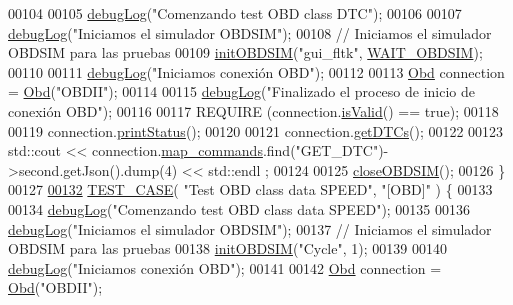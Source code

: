 \begin{DoxyCode}
{{{00104     
00105     \hyperlink{debug_8hpp_a55f41cf7b0585224496de3d7adbc101c}{debugLog}(\textcolor{stringliteral}{"Comenzando test OBD class DTC"});
00106 
00107     \hyperlink{debug_8hpp_a55f41cf7b0585224496de3d7adbc101c}{debugLog}(\textcolor{stringliteral}{"Iniciamos el simulador OBDSIM"});
00108     \textcolor{comment}{// Iniciamos el simulador OBDSIM para las pruebas}
00109     \hyperlink{UnitTestCase_8cpp_a15137ff9ba6032f171a43694f159ada6}{initOBDSIM}(\textcolor{stringliteral}{"gui\_fltk"}, \hyperlink{UnitTestCase_8cpp_a39116fcd47bddafea0487b3f674b9609}{WAIT\_OBDSIM});
00110 
00111     \hyperlink{debug_8hpp_a55f41cf7b0585224496de3d7adbc101c}{debugLog}(\textcolor{stringliteral}{"Iniciamos conexión OBD"});
00112 
00113     \hyperlink{classObd}{Obd} connection = \hyperlink{classObd}{Obd}(\textcolor{stringliteral}{"OBDII"});
00114 
00115     \hyperlink{debug_8hpp_a55f41cf7b0585224496de3d7adbc101c}{debugLog}(\textcolor{stringliteral}{"Finalizado el proceso de inicio de conexión OBD"});
00116 
00117     REQUIRE (connection.\hyperlink{classObd_ae28b765bb787467f929eae932133d2aa}{isValid}() == \textcolor{keyword}{true});
00118 
00119     connection.\hyperlink{classObd_a0938bfdd6d05795e826a239cc0f29f32}{printStatus}();
00120 
00121     connection.\hyperlink{classObd_ac57afb9228d933c6be5b2fa8e6446036}{getDTCs}();
00122 
00123     std::cout << connection.\hyperlink{classObd_a8300062d1b651d049cf2a2bc916496cd}{map\_commands}.find(\textcolor{stringliteral}{"GET\_DTC"})->second.getJson().dump(4) << std::endl
      ;
00124 
00125     \hyperlink{UnitTestCase_8cpp_ad24bf860f798931c63aaa488e08b8b4e}{closeOBDSIM}();
00126 \}
00127 
\hyperlink{UnitTestCase_8cpp_a88458940ca41021a9d50ac249c995fd1}{00132} \hyperlink{UnitTestCase_8cpp_ab1b7b485076e7de68cd9912827a8ee86}{TEST\_CASE}( \textcolor{stringliteral}{"Test OBD class data SPEED"}, \textcolor{stringliteral}{"[OBD]"} ) \{
00133     
00134     \hyperlink{debug_8hpp_a55f41cf7b0585224496de3d7adbc101c}{debugLog}(\textcolor{stringliteral}{"Comenzando test OBD class data SPEED"});
00135 
00136     \hyperlink{debug_8hpp_a55f41cf7b0585224496de3d7adbc101c}{debugLog}(\textcolor{stringliteral}{"Iniciamos el simulador OBDSIM"});
00137     \textcolor{comment}{// Iniciamos el simulador OBDSIM para las pruebas}
00138     \hyperlink{UnitTestCase_8cpp_a15137ff9ba6032f171a43694f159ada6}{initOBDSIM}(\textcolor{stringliteral}{"Cycle"}, 1);
00139 
00140     \hyperlink{debug_8hpp_a55f41cf7b0585224496de3d7adbc101c}{debugLog}(\textcolor{stringliteral}{"Iniciamos conexión OBD"});
00141 
00142     \hyperlink{classObd}{Obd} connection = \hyperlink{classObd}{Obd}(\textcolor{stringliteral}{"OBDII"});
}}}
\end{DoxyCode}
